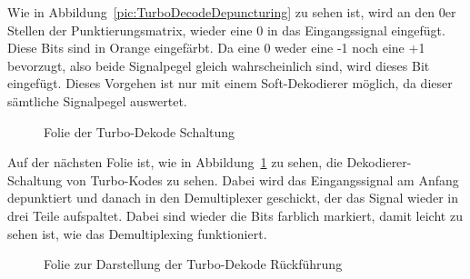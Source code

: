 Wie in Abbildung~\ref{pic:TurboDecodeDepuncturing} zu sehen ist, wird an den 0er Stellen der Punktierungsmatrix, wieder eine 0 in das Eingangssignal eingefügt. Diese Bits sind in Orange eingefärbt. Da eine 0 weder eine -1 noch eine +1 bevorzugt, also beide Signalpegel gleich wahrscheinlich sind, wird dieses Bit eingefügt. Dieses Vorgehen ist nur mit einem Soft-Dekodierer möglich, da dieser sämtliche Signalpegel auswertet. 

\begin{figure}[th]
\centering
{}
\caption{Folie der Turbo-Dekode Schaltung}
\label{pic:TurboDecode}
\end{figure}

Auf der nächsten Folie ist, wie in Abbildung~\ref{pic:TurboDecode} zu sehen, die Dekodierer-Schaltung von Turbo-Kodes zu sehen. Dabei wird das Eingangssignal am Anfang depunktiert und danach in den Demultiplexer geschickt, der das Signal wieder in drei Teile aufspaltet. Dabei sind wieder die Bits farblich markiert, damit leicht zu sehen ist, wie das Demultiplexing funktioniert.

\begin{figure}[th]
\centering
{}
\caption{Folie zur Darstellung der Turbo-Dekode Rückführung}
\label{pic:TurboDecodeBack}
\end{figure}

